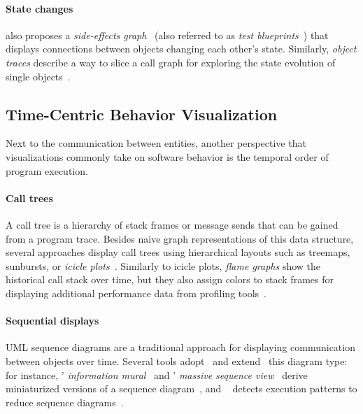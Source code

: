 \paragraph{State changes}

\Cite{lienhard2009flow} also proposes a \emph{side-effects graph}~\cite{fierz2009compass} (also referred to as \emph{test blueprints}~\cite{lienhard2008test}) that displays connections between objects changing each other's state.
Similarly, \emph{object traces} describe a way to slice a call graph for exploring the state evolution of single objects~\cite{thiede2023object,thiede2023time}.

\subsection{Time-Centric Behavior Visualization}

Next to the communication between entities, another perspective that visualizations commonly take on software behavior is the temporal order of program execution.

\paragraph{Call trees}

A call tree is a hierarchy of stack frames or message sends that can be gained from a program trace.
Besides naive graph representations of this data structure, several approaches display call trees using hierarchical layouts such as treemaps, sunbursts, or \emph{icicle plots}~\cite{kruskal1983icicle,trumper2012viewfusion,woodburn2019interactive}.
Similarly to icicle plots, \emph{flame graphs} show the historical call stack over time, but they also assign colors to stack frames for displaying additional performance data from profiling tools~\cite{gregg2016flame}.

\paragraph{Sequential displays}

UML sequence diagrams are a traditional approach for displaying communication between objects over time.
Several tools adopt~\cite{systä2001shimba} and extend~\cite{hamouLhadj2004survey} this diagram type: for instance, ' \emph{information mural}~\cite{jerding1998information} and ' \emph{massive sequence view}~\cite{cornelissen2009trace} derive miniaturized versions of a sequence diagram~\cite[sec. 3.4]{lemieux2006visualization}, and ~\cite{dePauw1998execution} detects execution patterns to reduce sequence diagrams~\cite{hamouLhadj2004survey}.
